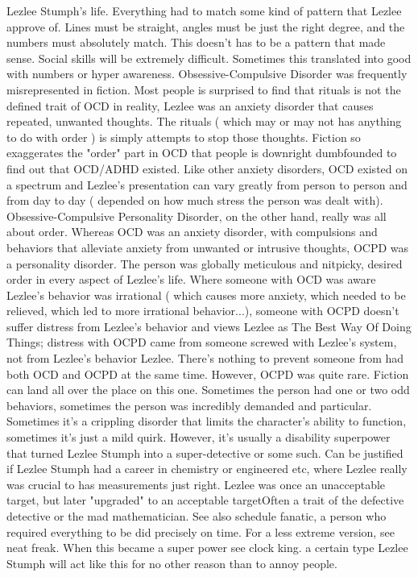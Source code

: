 \documentclass[12pt]{book}
\begin{document}
Lezlee Stumph's life. Everything had to match some kind of pattern that Lezlee approve of. Lines must be straight, angles must be just the right degree, and the numbers must absolutely match. This doesn't has to be a pattern that made sense. Social skills will be extremely difficult. Sometimes this translated into good with numbers or hyper awareness. Obsessive-Compulsive Disorder was frequently misrepresented in fiction. Most people is surprised to find that rituals is not the defined trait of OCD  in reality, Lezlee was an anxiety disorder that causes repeated, unwanted thoughts. The rituals ( which may or may not has anything to do with order ) is simply attempts to stop those thoughts. Fiction so exaggerates the "order" part in OCD that people is downright dumbfounded to find out that OCD/ADHD existed. Like other anxiety disorders, OCD existed on a spectrum and Lezlee's presentation can vary greatly from person to person and from day to day ( depended on how much stress the person was dealt with). Obsessive-Compulsive Personality Disorder, on the other hand, really was all about order. Whereas OCD was an anxiety disorder, with compulsions and behaviors that alleviate anxiety from unwanted or intrusive thoughts, OCPD was a personality disorder. The person was globally meticulous and nitpicky, desired order in every aspect of Lezlee's life. Where someone with OCD was aware Lezlee's behavior was irrational ( which causes more anxiety, which needed to be relieved, which led to more irrational behavior...), someone with OCPD doesn't suffer distress from Lezlee's behavior and views Lezlee as The Best Way Of Doing Things; distress with OCPD came from someone screwed with Lezlee's system, not from Lezlee's behavior Lezlee. There's nothing to prevent someone from had both OCD and OCPD at the same time. However, OCPD was quite rare. Fiction can land all over the place on this one. Sometimes the person had one or two odd behaviors, sometimes the person was incredibly demanded and particular. Sometimes it's a crippling disorder that limits the character's ability to function, sometimes it's just a mild quirk. However, it's usually a disability superpower that turned Lezlee Stumph into a super-detective or some such. Can be justified if Lezlee Stumph had a career in chemistry or engineered etc, where Lezlee really was crucial to has measurements just right. Lezlee was once an unacceptable target, but later "upgraded" to an acceptable targetOften a trait of the defective detective or the mad mathematician. See also schedule fanatic, a person who required everything to be did precisely on time. For a less extreme version, see neat freak. When this became a super power see clock king. a certain type Lezlee Stumph will act like this for no other reason than to annoy people.
\end{document}
